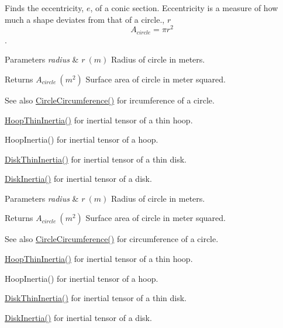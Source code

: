 Finds the eccentricity, $e$, of a conic section. Eccentricity is a measure of how much a shape deviates from that of a circle., $r$ \[ A_{circle}=\pi r^2 \].


\begin{DoxyParams}{Parameters}
{\em radius} & $ r\ (m)$ Radius of circle in meters. \\
\hline
\end{DoxyParams}
\begin{DoxyReturn}{Returns}
$ A_{circle}\ (m^2)$ Surface area of circle in meter squared. 
\end{DoxyReturn}
\begin{DoxySeeAlso}{See also}
\mbox{\hyperlink{group___e_g_x_math-_geometry-2_d-_circle_gadb55695b75a06a3f3534494eb767e18e}{Circle\+Circumference()}} for ircumference of a circle. 

\mbox{\hyperlink{group___e_g_x_math-_geometry-3_d-_hoop_gab3a84dc2aa29ce0db990425747d291c6}{Hoop\+Thin\+Inertia()}} for inertial tensor of a thin hoop. 

Hoop\+Inertia() for inertial tensor of a hoop. 

\mbox{\hyperlink{group___e_g_x_math-_geometry-3_d-_disk_ga8dcadf6cd5680294a84311c6767e3caf}{Disk\+Thin\+Inertia()}} for inertial tensor of a thin disk. 

\mbox{\hyperlink{group___e_g_x_math-_geometry-3_d-_disk_ga6ed461694b277e36a641a6550bdea68f}{Disk\+Inertia()}} for inertial tensor of a disk.
\end{DoxySeeAlso}

\begin{DoxyParams}{Parameters}
{\em radius} & $ r\ (m)$ Radius of circle in meters. \\
\hline
\end{DoxyParams}
\begin{DoxyReturn}{Returns}
$ A_{circle}\ (m^2)$ Surface area of circle in meter squared. 
\end{DoxyReturn}
\begin{DoxySeeAlso}{See also}
\mbox{\hyperlink{group___e_g_x_math-_geometry-2_d-_circle_gadb55695b75a06a3f3534494eb767e18e}{Circle\+Circumference()}} for circumference of a circle. 

\mbox{\hyperlink{group___e_g_x_math-_geometry-3_d-_hoop_gab3a84dc2aa29ce0db990425747d291c6}{Hoop\+Thin\+Inertia()}} for inertial tensor of a thin hoop. 

Hoop\+Inertia() for inertial tensor of a hoop. 

\mbox{\hyperlink{group___e_g_x_math-_geometry-3_d-_disk_ga8dcadf6cd5680294a84311c6767e3caf}{Disk\+Thin\+Inertia()}} for inertial tensor of a thin disk. 

\mbox{\hyperlink{group___e_g_x_math-_geometry-3_d-_disk_ga6ed461694b277e36a641a6550bdea68f}{Disk\+Inertia()}} for inertial tensor of a disk. 
\end{DoxySeeAlso}
